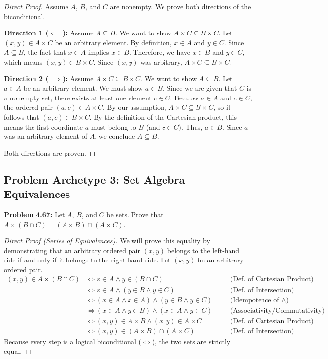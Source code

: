 \documentclass[12pt]{article}
\theoremstyle{definition}
\theoremstyle{remark}
\begin{document}
\begin{proof}[Direct Proof]
Assume $A$, $B$, and $C$ are nonempty. We prove both directions of the biconditional.

\textbf{Direction 1 ($\impliedby$):} Assume $A \subseteq B$. We want to show $A \times C \subseteq B \times C$.
Let $(x, y) \in A \times C$ be an arbitrary element. By definition, $x \in A$ and $y \in C$. Since $A \subseteq B$, the fact that $x \in A$ implies $x \in B$. Therefore, we have $x \in B$ and $y \in C$, which means $(x, y) \in B \times C$. Since $(x,y)$ was arbitrary, $A \times C \subseteq B \times C$.

\textbf{Direction 2 ($\implies$):} Assume $A \times C \subseteq B \times C$. We want to show $A \subseteq B$.
Let $a \in A$ be an arbitrary element. We must show $a \in B$. Since we are given that $C$ is a nonempty set, there exists at least one element $c \in C$. Because $a \in A$ and $c \in C$, the ordered pair $(a, c) \in A \times C$. By our assumption, $A \times C \subseteq B \times C$, so it follows that $(a, c) \in B \times C$. By the definition of the Cartesian product, this means the first coordinate $a$ must belong to $B$ (and $c \in C$). Thus, $a \in B$. Since $a$ was an arbitrary element of $A$, we conclude $A \subseteq B$.

Both directions are proven.
\end{proof}

\subsection{Problem Archetype 3: Set Algebra Equivalences}

\textbf{Problem 4.67:} Let $A$, $B$, and $C$ be sets. Prove that $A \times (B \cap C) = (A \times B) \cap (A \times C)$.

\begin{proof}[Direct Proof (Series of Equivalences)]
We will prove this equality by demonstrating that an arbitrary ordered pair $(x,y)$ belongs to the left-hand side if and only if it belongs to the right-hand side. Let $(x,y)$ be an arbitrary ordered pair.
\begin{align*}
(x, y) \in A \times (B \cap C) &\iff x \in A \land y \in (B \cap C) \quad &&\text{(Def. of Cartesian Product)} \\
&\iff x \in A \land (y \in B \land y \in C) \quad &&\text{(Def. of Intersection)} \\
&\iff (x \in A \land x \in A) \land (y \in B \land y \in C) \quad &&\text{(Idempotence of $\land$)} \\
&\iff (x \in A \land y \in B) \land (x \in A \land y \in C) \quad &&\text{(Associativity/Commutativity)} \\
&\iff (x, y) \in A \times B \land (x, y) \in A \times C \quad &&\text{(Def. of Cartesian Product)} \\
&\iff (x, y) \in (A \times B) \cap (A \times C) \quad &&\text{(Def. of Intersection)}
\end{align*}
Because every step is a logical biconditional ($\iff$), the two sets are strictly equal.
\end{proof}
\end{document}
